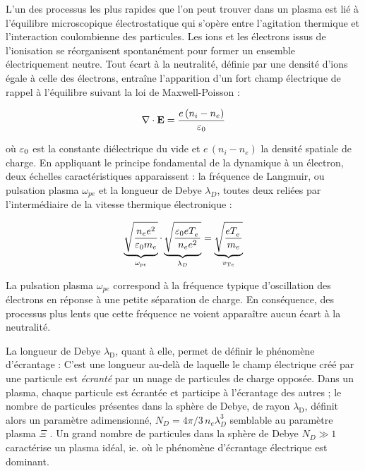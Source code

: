 \begin{refsection}
L'un des processus les plus rapides que l'on peut trouver dans un plasma est lié à
l'équilibre microscopique électrostatique qui s'opère
entre l'agitation thermique et l'interaction coulombienne des particules. Les
ions et les électrons issus de l'ionisation se réorganisent spontanément pour former un ensemble électriquement neutre.
Tout écart à la neutralité, définie par une densité d'ions égale à celle des
électrons, entraîne l'apparition d'un fort champ électrique de rappel à
l'équilibre suivant la loi de Maxwell-Poisson :

\begin{align}
\label{1-Max-Poisson}
\nabla\cdot\mathbf{E}=\frac{e\,(n_{i}-n_{e})}{\varepsilon{_{0}}}
\end{align}

où $\varepsilon{_{0}}$ est la constante diélectrique du
vide et $e\,(n_{i}-n_{e})$ la densité spatiale de charge. 
En appliquant le principe fondamental de la dynamique à un électron, deux
échelles caractéristiques apparaissent : la fréquence de Langmuir, ou pulsation
plasma $\omega_{pe}$ et la longueur de Debye $\lambda_D$, toutes deux reliées
par l'intermédiaire de la vitesse thermique électronique :

\begin{equation}
\underbrace{\sqrt{\frac{n_e
e^{{2}}}{\varepsilon{_{0}}
m_{e}}}}_{\omega_{pe}}\cdot\underbrace{\sqrt{\frac{\varepsilon{_{0}}
eT_{e}^{{\phantom{1}}}}{n_e e^{{2}}}}}_{\lambda_D}
=\underbrace{\sqrt{\frac{eT_{e}^{{\phantom{1}}}}{m_{e}}}}_{v_{\text{T}{e}}}
\end{equation}

La pulsation plasma $\omega_{pe}$ correspond à la fréquence typique
d'oscillation des électrons en réponse à une petite séparation de charge. En
conséquence, des processus plus lents que cette fréquence ne voient
apparaître aucun écart à la neutralité.

La longueur de Debye $\lambda_\text{D}$, quant à elle, permet de définir le
phénomène d'écrantage :
C'est une longueur au-delà de laquelle le champ électrique créé par une particule est \emph{écranté} par 
un nuage de particules de charge opposée. Dans un plasma, chaque particule est
écrantée et participe à l'écrantage des autres ; le nombre de particules présentes
dans la sphère de Debye, de rayon $\lambda_\text{D}$, définit alors un paramètre
adimensionné, $N_D=4\pi/3\,n_e\lambda_D^3$ semblable au paramètre plasma $\Xi$
. Un grand nombre de particules dans la sphère de Debye
$N_D\gg1$ caractérise un plasma idéal, ie. où le
phénomène d'écrantage électrique est dominant.


\end{refsection}

